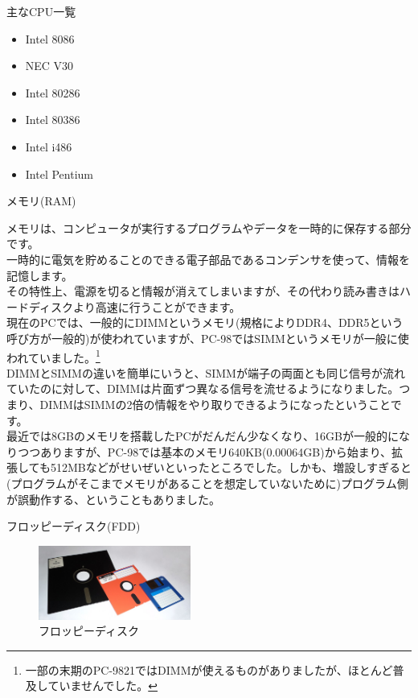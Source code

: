 \documentclass[b5paper,9pt,platex,dvipdfmx]{jsarticle}
\begin{document}
\begin{multicols*}{3}
\begin{enumerate}
\begin{itembox}[l]{主なCPU一覧}
  \begin{itemize}
    \item Intel 8086
    \item NEC V30
    \item Intel 80286
    \item Intel 80386
    \item Intel i486
    \item Intel Pentium
  \end{itemize}
\end{itembox}
  {\bf  \item メモリ(RAM)\\}
  メモリは、コンピュータが実行するプログラムやデータを一時的に保存する部分です。\\
  一時的に電気を貯めることのできる電子部品であるコンデンサを使って、情報を記憶します。\\
  その特性上、電源を切ると情報が消えてしまいますが、その代わり読み書きはハードディスクより高速に行うことができます。\\
  現在のPCでは、一般的にDIMMというメモリ(規格によりDDR4、DDR5という呼び方が一般的)が使われていますが、PC-98ではSIMMというメモリが一般に使われていました。\footnote{一部の末期のPC-9821ではDIMMが使えるものがありましたが、ほとんど普及していませんでした。}\\
  DIMMとSIMMの違いを簡単にいうと、SIMMが端子の両面とも同じ信号が流れていたのに対して、DIMMは片面ずつ異なる信号を流せるようになりました。つまり、DIMMはSIMMの2倍の情報をやり取りできるようになったということです。\\
  最近では8GBのメモリを搭載したPCがだんだん少なくなり、16GBが一般的になりつつありますが、PC-98では基本のメモリ640KB(0.00064GB)から始まり、拡張しても512MBなどがせいぜいといったところでした。しかも、増設しすぎると(プログラムがそこまでメモリがあることを想定していないために)プログラム側が誤動作する、ということもありました。\\
  {\bf  \item フロッピーディスク(FDD)\\}
  \begin{figure}[H]
    \centering
    \includegraphics[width=5cm]{img-3.jpg}
    \caption{フロッピーディスク}
  \end{figure}

\end{enumerate}
\end{multicols*}
\end{document}
